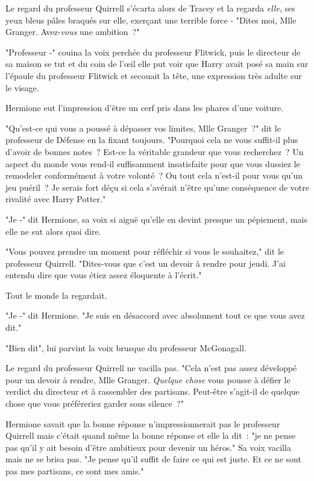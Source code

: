 Le regard du professeur Quirrell s'écarta alors de Tracey et la regarda \emph{elle}, ses yeux bleus pâles braqués sur elle, exerçant une terrible force - "Dites moi, Mlle Granger. Avez-\emph{vous} une ambition~?"

"Professeur -" couina la voix perchée du professeur Flitwick, puis le directeur de sa maison se tut et du coin de l'œil elle put voir que Harry avait posé sa main sur l'épaule du professeur Flitwick et secouait la tête, une expression très adulte sur le visage.

Hermione eut l'impression d'être un cerf pris dans les phares d'une voiture.

"Qu'est-ce qui vous a poussé à dépasser vos limites, Mlle Granger~?" dit le professeur de Défense en la fixant toujours. "Pourquoi cela ne vous suffit-il plus d'avoir de bonnes notes~? Est-ce la véritable grandeur que vous recherchez~? Un aspect du monde vous rend-il suffisamment insatisfaite pour que vous dussiez le remodeler conformément à votre volonté~? Ou tout cela n'est-il pour vous qu'un jeu puéril~? Je serais fort déçu si cela s'avérait n'être qu'une conséquence de votre rivalité avec Harry Potter."

"Je -" dit Hermione, sa voix si aiguë qu'elle en devint presque un pépiement, mais elle ne sut alors quoi dire.

"Vous pouvez prendre un moment pour réfléchir si vous le souhaitez," dit le professeur Quirrell. "Dites-vous que c'est un devoir à rendre pour jeudi. J'ai entendu dire que vous étiez assez éloquente à l'écrit."

Tout le monde la regardait.

"Je -" dit Hermione. "Je suis en désaccord avec absolument tout ce que vous avez dit."

"Bien dit", lui parvint la voix brusque du professeur McGonagall.

Le regard du professeur Quirrell ne vacilla pas. "Cela n'est pas assez développé pour un devoir à rendre, Mlle Granger. \emph{Quelque chose} vous pousse à défier le verdict du directeur et à rassembler des partisans. Peut-être s'agit-il de quelque chose que vous préféreriez garder sous silence~?"

Hermione savait que la bonne réponse n'impressionnerait pas le professeur Quirrell mais c'était quand même la bonne réponse et elle la dit~: "je ne pense pas qu'il y ait besoin d'être ambitieux pour devenir un héros." Sa voix vacilla mais ne se brisa pas. "Je pense qu'il suffit de faire ce qui est juste. Et ce ne sont pas mes partisans, ce sont mes amis."

